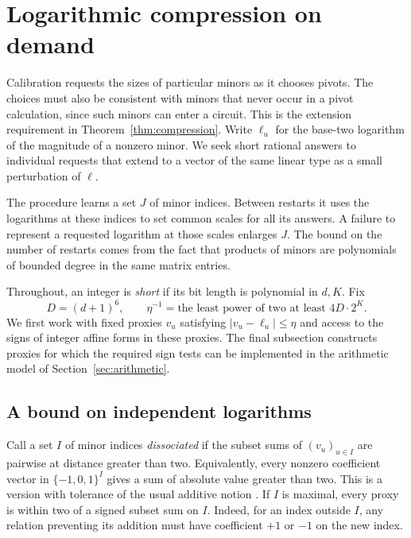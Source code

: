 \section{Logarithmic compression on demand}\label{sec:compression}

Calibration requests the sizes of particular minors as it chooses pivots.
The choices must also be consistent with minors that never occur in a
pivot calculation, since such minors can enter a circuit. This is the
extension requirement in Theorem~\ref{thm:compression}. Write \(\ell_u\)
for the base-two logarithm of the magnitude of a nonzero minor. We seek
short rational answers to individual requests that extend to a vector
of the same linear type as a small perturbation of \(\ell\).

The procedure learns a set \(J\) of minor indices. Between restarts it
uses the logarithms at these indices to set common scales for all its
answers. A failure to represent a requested logarithm at those scales
enlarges \(J\). The bound on the number of restarts comes from the fact
that products of minors are polynomials of bounded degree in the same
matrix entries.

Throughout, an integer is \emph{short} if its bit length is polynomial
in \(d,K\). Fix
\[
 D=(d+1)^6,\qquad
 \eta^{-1}=\text{the least power of two at least }4D\cdot2^K .
\]
We first work with fixed proxies \(v_u\) satisfying
\(|v_u-\ell_u|\le\eta\) and access to the signs of integer affine
forms in these proxies. The final subsection constructs proxies for
which the required sign tests can be implemented in the arithmetic
model of Section~\ref{sec:arithmetic}.

\subsection{A bound on independent logarithms}

Call a set \(I\) of minor indices \emph{dissociated} if the subset sums
of \((v_u)_{u\in I}\) are pairwise at distance greater than two.
Equivalently, every nonzero coefficient vector in
\(\{-1,0,1\}^I\) gives a sum of absolute value greater than two.
This is a version with tolerance of the usual additive notion
\cite{LY}. If \(I\) is maximal, every proxy is within two of a signed
subset sum on \(I\). Indeed, for an index outside \(I\), any relation
preventing its addition must have coefficient \(+1\) or \(-1\) on the
new index.

